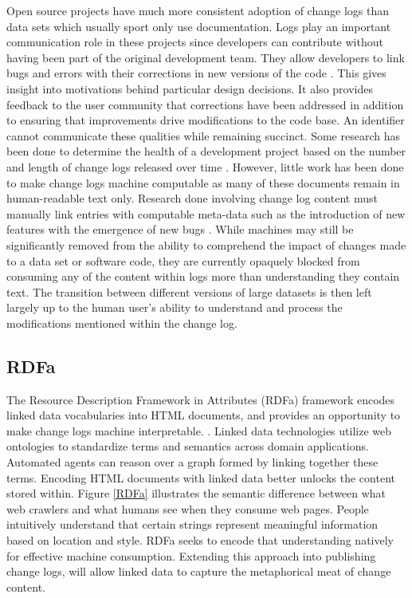 Open source projects have much more consistent adoption of change logs than data sets which usually sport only use documentation.
Logs play an important communication role in these projects since developers can contribute without having been part of the original development team.
They allow developers to link bugs and errors with their corrections in new versions of the code \cite{Chen:2004:OCL:990374.990391}.
This gives insight into motivations behind particular design decisions.
It also provides feedback to the user community that corrections have been addressed in addition to ensuring that improvements drive modifications to the code base.
An identifier cannot communicate these qualities while remaining succinct.
Some research has been done to determine the health of a development project based on the number and length of change logs released over time \cite{German03automatingthe}.
However, little work has been done to make change logs machine computable as many of these documents remain in human-readable text only.
Research done involving change log content must manually link entries with computable meta-data such as the introduction of new features with the emergence of new bugs \cite{6132954}.
While machines may still be significantly removed from the ability to comprehend the impact of changes made to a data set or software code, they are currently opaquely blocked from consuming any of the content within logs more than understanding they contain text.
The transition between different versions of large datasets is then left largely up to the human user's ability to understand and process the modifications mentioned within the change log.

\subsection{RDFa}

The Resource Description Framework in Attributes (RDFa) framework encodes linked data vocabularies into HTML documents, and provides an opportunity to make change logs machine interpretable. \cite{Adida2015}.
Linked data technologies utilize web ontologies to standardize terms and semantics across domain applications.
Automated agents can reason over a graph formed by linking together these terms.
Encoding HTML documents with linked data better unlocks the content stored within.
Figure \ref{RDFa} illustrates the semantic difference between what web crawlers and what humans see when they consume web pages.
People intuitively understand that certain strings represent meaningful information based on location and style.
RDFa seeks to encode that understanding natively for effective machine consumption.
Extending this approach into publishing change logs, will allow linked data to capture the metaphorical meat of change content.

